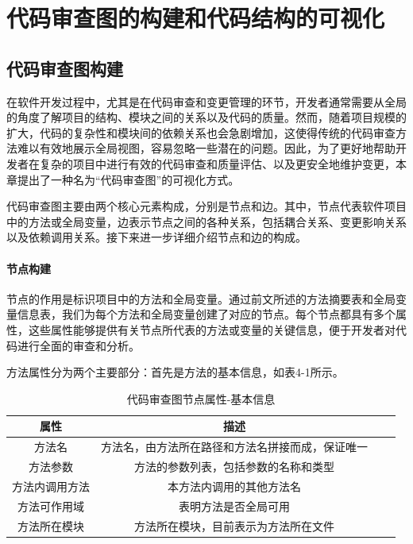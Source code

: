 \section{代码审查图的构建和代码结构的可视化}

\subsection{代码审查图构建}

在软件开发过程中，尤其是在代码审查和变更管理的环节，开发者通常需要从全局的角度了解项目的结构、模块之间的关系以及代码的质量。然而，随着项目规模的扩大，代码的复杂性和模块间的依赖关系也会急剧增加，这使得传统的代码审查方法难以有效地展示全局视图，容易忽略一些潜在的问题。因此，为了更好地帮助开发者在复杂的项目中进行有效的代码审查和质量评估、以及更安全地维护变更，本章提出了一种名为“代码审查图”的可视化方式。

代码审查图主要由两个核心元素构成，分别是节点和边。其中，节点代表软件项目中的方法或全局变量，边表示节点之间的各种关系，包括耦合关系、变更影响关系以及依赖调用关系。接下来进一步详细介绍节点和边的构成。

\paragraph{节点构建} 节点的作用是标识项目中的方法和全局变量。通过前文所述的方法摘要表和全局变量信息表，我们为每个方法和全局变量创建了对应的节点。每个节点都具有多个属性，这些属性能够提供有关节点所代表的方法或变量的关键信息，便于开发者对代码进行全面的审查和分析。

方法属性分为两个主要部分：首先是方法的基本信息，如表4-1所示。

\begin{table}[htbp]
\caption{代码审查图节点属性-基本信息}
\vspace{0.5em}\centering\wuhao
\begin{tabular}{cccc}
\toprule
    属性 & 描述 \\
\midrule
方法名 & 方法名，由方法所在路径和方法名拼接而成，保证唯一  \\
方法参数 & 方法的参数列表，包括参数的名称和类型   \\
方法内调用方法 & 本方法内调用的其他方法名   \\
方法可作用域 & 表明方法是否全局可用   \\
方法所在模块 &  方法所在模块，目前表示为方法所在文件  \\ 
\bottomrule
\end{tabular}
\end{table}

